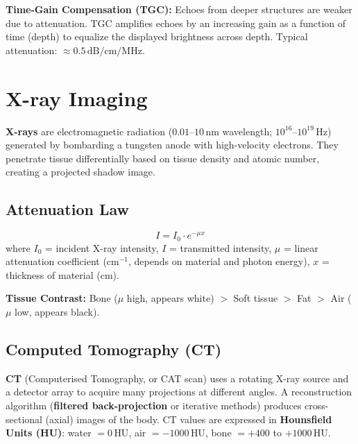 \documentclass[12pt,a4paper]{article}
\begin{document}
\textbf{Time-Gain Compensation (TGC):} Echoes from deeper structures are weaker due to attenuation. TGC amplifies echoes by an increasing gain as a function of time (depth) to equalize the displayed brightness across depth. Typical attenuation: $\approx 0.5\,\text{dB/cm/MHz}$.

\section{X-ray Imaging}

\begin{tcolorbox}[defbox, title={\textbf{X-ray Imaging}}]
\textbf{X-rays} are electromagnetic radiation ($0.01$--$10\,\text{nm}$ wavelength; $10^{16}$--$10^{19}\,\text{Hz}$) generated by bombarding a tungsten anode with high-velocity electrons. They penetrate tissue differentially based on tissue density and atomic number, creating a projected shadow image.
\end{tcolorbox}

\subsection{Attenuation Law}

\begin{tcolorbox}[formulabox, title={\textbf{Beer-Lambert Law for X-rays}}]
\[
I = I_0 \cdot e^{-\mu x}
\]
where $I_0$ = incident X-ray intensity, $I$ = transmitted intensity, $\mu$ = linear attenuation coefficient (cm$^{-1}$, depends on material and photon energy), $x$ = thickness of material (cm).
\end{tcolorbox}

\textbf{Tissue Contrast:} Bone ($\mu$ high, appears white) $>$ Soft tissue $>$ Fat $>$ Air ($\mu$ low, appears black).

\subsection{Computed Tomography (CT)}

\begin{tcolorbox}[defbox, title={\textbf{Computed Tomography (CT)}}]
\textbf{CT} (Computerised Tomography, or CAT scan) uses a rotating X-ray source and a detector array to acquire many projections at different angles. A reconstruction algorithm (\textbf{filtered back-projection} or iterative methods) produces cross-sectional (axial) images of the body. CT values are expressed in \textbf{Hounsfield Units (HU)}: water $= 0\,\text{HU}$, air $= -1000\,\text{HU}$, bone $= +400$ to $+1000\,\text{HU}$.
\end{tcolorbox}
\end{document}
